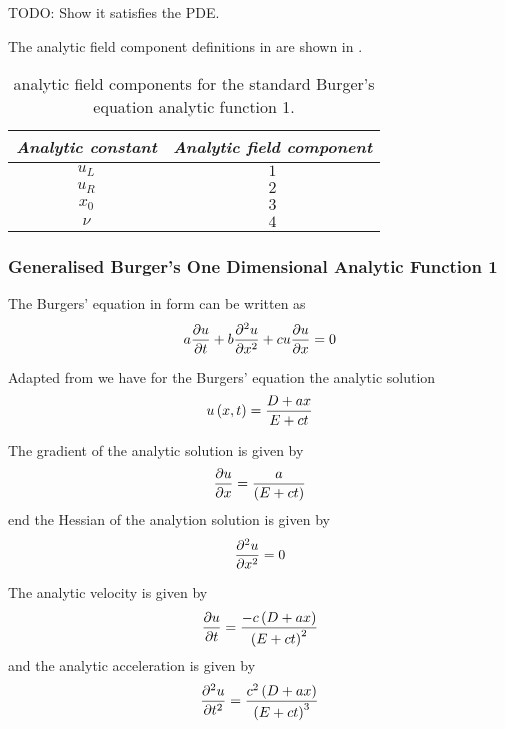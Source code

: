 TODO: Show it satisfies the PDE.

The analytic field component definitions in \OpenCMISS are shown in .

\begin{table}[htb] \centering
  \begin{tabular}{|c|c|} \hline
    \emph{Analytic constant} & \emph{Analytic field component} \\ \hline \hline
    $u_{L}$ & $1$ \\ 
    $u_{R}$ & $2$ \\ 
    $x_{0}$ & $3$ \\
    $\nu$ & $4$ \\ \hline
  \end{tabular}
  \caption{\OpenCMISS analytic field components for the \oned standard Burger's equation
    analytic function 1.}
  \label{tab:OpenCMISSAnalyticFieldStandardBurgersEquationOneDim1}
\end{table}

\subsubsection{Generalised Burger's One Dimensional Analytic Function 1}

The \oned Burgers' equation in \OpenCMISS form can be written as
\begin{equation}
  a\delby{u}{t}+b\deltwosqby{u}{x}+cu\delby{u}{x}=0
  \label{eqn:OpenCMISSGeneralisedBurgerEquationOneDim}
\end{equation}

Adapted from  we
have for the \oned Burgers' equation the analytic solution
\begin{equation}
  \fnof{u}{x,t}=\dfrac{D+ax}{E+ct}
  \label{eqn:GeneralisedBurgersEquationAnalyticOneDim1}
\end{equation}

The gradient of the analytic solution is given by
\begin{equation}
   \dfrac{\partial u}{\partial x} =\dfrac{a}{\left( E+ct \right)}
\end{equation}
end the Hessian of the analytion solution is given by
\begin{equation}
   \dfrac{\partial^{2} u}{\partial {x}^{2}} =0 
\end{equation}

The analytic velocity is given by
\begin{equation}
   \dfrac{\partial u}{\partial t} =\dfrac{-c\left( D+ax \right)}{\left( E+ct \right)^{2}} \\
\end{equation}
and the analytic acceleration is given by
\begin{equation}
   \dfrac{\partial^{2} u}{\partial {t}^{2}} =\dfrac{c^{2}\left( D+ax \right)}{\left( E+ct \right)^{3}} \\
\end{equation}

